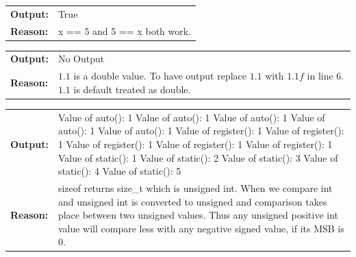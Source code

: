 \documentclass[a4paper,oneside]{book}
\begin{document}
\begin{mdframed}[style=MyFrame]
\begin{tabular}[H]{p{1.5cm}p{15cm}}
\textbf{Output:} & True \\
\textbf{Reason:} & x == 5 and 5 == x both work.\\
\end{tabular}
\end{mdframed}
\begin{mdframed}[style=MyFrame]
\begin{tabular}[H]{p{1.5cm}p{15cm}}
\textbf{Output:} & No Output \\
\textbf{Reason:} & $1.1$ is a double value. To have output replace $1.1$ with $1.1f$ in line $6$. $1.1$ is default treated as double.\\
\end{tabular}
\end{mdframed}
\begin{mdframed}[style=MyFrame]
\begin{tabular}[H]{p{1.5cm}p{15cm}}
\textbf{Output:} & Value of auto(): 1
Value of auto(): 1
Value of auto(): 1
Value of auto(): 1
Value of auto(): 1
Value of register(): 1
Value of register(): 1
Value of register(): 1
Value of register(): 1
Value of register(): 1
Value of static(): 1
Value of static(): 2
Value of static(): 3
Value of static(): 4
Value of static(): 5
 \\ 
\textbf{Reason:} & sizeof returns size\_t which is unsigned int. When we compare int and unsigned int is converted to unsigned and comparison takes place between two unsigned values. Thus any unsigned positive int value will compare less with any negative signed value, if its MSB is 0. \\ 
\end{tabular}
\end{mdframed}

\restoregeometry














 \printindex
\end{document}
